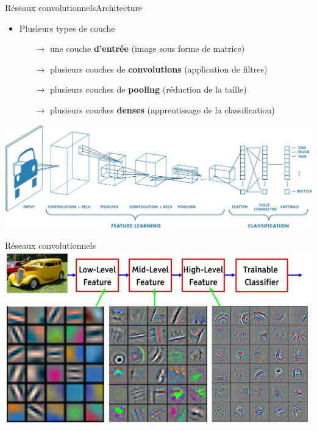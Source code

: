 \documentclass[compress]{beamer}
\begin{document}
\begin{frame}{Réseaux convolutionnels}{Architecture}
	\begin{itemize}
		\item Plusieurs types de couche
  	\begin{itemize}
  		\item[$\rightarrow$] une couche \textbf{\color{fibeamer@orange}d'entrée} (image sous forme de matrice)
  		\item[$\rightarrow$] plusieurs couches de \textbf{\color{fibeamer@orange}convolutions} (application de filtres)
  		\item[$\rightarrow$] plusieurs couches de \textbf{\color{fibeamer@orange}pooling} (réduction de la taille)
  		 \item[$\rightarrow$] plusieurs couches \textbf{\color{fibeamer@orange}denses} (apprentissage de la classification)
  	\end{itemize}
	\end{itemize}
	\bigskip
	\centering
	\includegraphics[width=1\linewidth]{resources/clem/convolutional_netowrk}
\end{frame}

\begin{frame}{Réseaux convolutionnels}
	\centering
	\includegraphics[width=1\linewidth]{resources/clem/features}
\end{frame}
\end{document}
